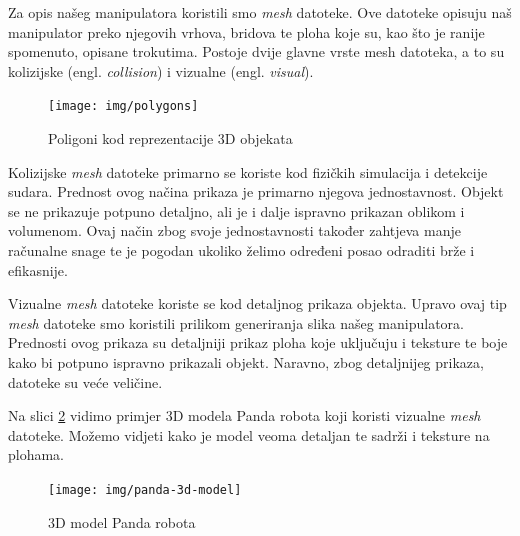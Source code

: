 \documentclass[times, utf8, diplomskirad]{fer}
\begin{document}
Za opis našeg manipulatora koristili smo \textit{mesh} datoteke.
Ove datoteke opisuju naš manipulator preko njegovih vrhova, bridova te ploha koje su, kao što je ranije spomenuto, opisane trokutima.
Postoje dvije glavne vrste mesh datoteka, a to su kolizijske (engl. \textit{collision}) i vizualne (engl. \textit{visual}).

\begin{figure}[H]
    \centering
    \texttt{[image: img/polygons]}
    \caption{Poligoni kod reprezentacije 3D objekata}
    \label{fig:polygons}
\end{figure}

Kolizijske \textit{mesh} datoteke primarno se koriste kod fizičkih simulacija i detekcije sudara.
Prednost ovog načina prikaza je primarno njegova jednostavnost.
Objekt se ne prikazuje potpuno detaljno, ali je i dalje ispravno prikazan oblikom i volumenom.
Ovaj način zbog svoje jednostavnosti također zahtjeva manje računalne snage te je pogodan ukoliko želimo određeni posao odraditi brže i efikasnije.

Vizualne \textit{mesh} datoteke koriste se kod detaljnog prikaza objekta.
Upravo ovaj tip \textit{mesh} datoteke smo koristili prilikom generiranja slika našeg manipulatora.
Prednosti ovog prikaza su detaljniji prikaz ploha koje uključuju i teksture te boje kako bi potpuno ispravno prikazali objekt.
Naravno, zbog detaljnijeg prikaza, datoteke su veće veličine.

Na slici \ref{fig:panda-3d-model} vidimo primjer 3D modela Panda robota koji koristi vizualne \textit{mesh} datoteke.
Možemo vidjeti kako je model veoma detaljan te sadrži i teksture na plohama.

\begin{figure}[H]
    \centering
    \texttt{[image: img/panda-3d-model]}
    \caption{3D model Panda robota}
    \label{fig:panda-3d-model}
\end{figure}
\end{document}
